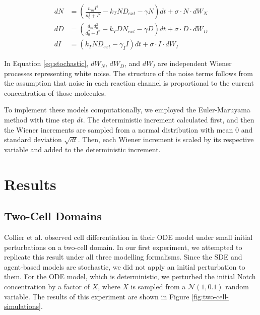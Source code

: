 \documentclass{article}
\begin{document}
\begin{flushleft}
\begin{equation}
\begin{aligned}
  dN &= \left( \frac{n_{m}I^2}{n_{0}^2 + I^2} - k_{T}ND_{ext} - \gamma N \right) dt + \sigma \cdot N \cdot dW_{N} \\[5pt]
  dD &= \left( \frac{d_{m}d_{0}^2}{d_{0}^2 + I^2} - k_{T}DN_{ext} - \gamma D \right)  dt + \sigma \cdot D \cdot dW_{D}  \\[5pt]
  dI &= \left( k_{T}ND_{ext} - \gamma_{I}I \right) dt + \sigma \cdot I \cdot dW_{I}
\end{aligned}
\label{eq:stochastic}
\end{equation}

In Equation \ref{eq:stochastic}, $dW_N$, $dW_D$, and $dW_I$ are independent Wiener processes representing white noise.
The structure of the noise terms follows from the assumption that noise in each reaction channel is proportional to the current concentration of those molecules.

\medskip

To implement these models computationally, we employed the Euler-Maruyama method with time step $dt$.
The deterministic increment calculated first, and then the Wiener increments are sampled from a normal distribution with mean $0$ and standard deviation $\sqrt{dt}$.
Then, each Wiener increment is scaled by its respective variable and added to the deterministic increment.

\section*{Results}


\subsection*{Two-Cell Domains}

Collier et al. \cite{collier_pattern_1996} observed cell differentiation in their ODE model under small initial perturbations on a two-cell domain.
In our first experiment, we attempted to replicate this result under all three modelling formalisms.
Since the SDE and agent-based models are stochastic, we did not apply an initial perturbation to them.
For the ODE model, which is deterministic, we perturbed the initial Notch concentration by a factor of $X$, where $X$ is sampled from a $\mathcal{N}(1, 0.1)$ random variable.
The results of this experiment are shown in Figure \ref{fig:two-cell-simulations}.


\end{flushleft}
\end{document}
